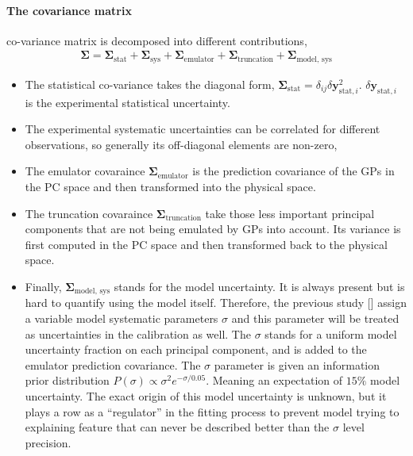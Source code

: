 \paragraph{The covariance matrix} co-variance matrix is decomposed into different contributions,
\begin{eqnarray}
\mathbf{\Sigma} = \mathbf{\Sigma}_{\textrm{stat}} + \mathbf{\Sigma}_{\textrm{sys}} + \mathbf{\Sigma}_{\textrm{emulator}} + \mathbf{\Sigma}_{\textrm{truncation}} + \mathbf{\Sigma}_{\textrm{model, sys}}
\end{eqnarray}
\begin{itemize}
\item The statistical co-variance takes the diagonal form, $\mathbf{\Sigma}_{\textrm{stat}} = \delta_{ij}\delta\mathbf{y}_{\textrm{stat}, i}^2$. 
$\delta\mathbf{y}_{\textrm{stat}, i}$ is the experimental statistical uncertainty.
\item The experimental systematic uncertainties can be correlated for different observations, so generally its off-diagonal elements are non-zero,
\item The emulator covaraince $\mathbf{\Sigma}_{\textrm{emulator}}$ is the prediction covariance of the GPs in the PC space and then transformed into the physical space.
\item The truncation covaraince $\mathbf{\Sigma}_{\textrm{truncation}}$ take those less important principal components that are not being emulated by GPs into account. 
Its variance is first computed in the PC space and then transformed back to the physical space.
\item Finally, $\mathbf{\Sigma}_{\textrm{model, sys}}$ stands for the model uncertainty. 
It is always present but is hard to quantify using the model itself.
Therefore, the previous study [] assign a variable model systematic parameters $\sigma$ and this parameter will be treated as uncertainties in the calibration as well.
The $\sigma$ stands for a uniform model uncertainty fraction on each principal component, and is added to the emulator prediction covariance.
The $\sigma$ parameter is given an information prior distribution $P(\sigma) \propto \sigma^2 e^{-\sigma/0.05}$. Meaning an expectation of $15\%$ model uncertainty.
The exact origin of this model uncertainty is unknown, but it plays a row as a ``regulator'' in the fitting process to prevent model trying to explaining feature that can never be described better than the $\sigma$ level precision.
\end{itemize}

